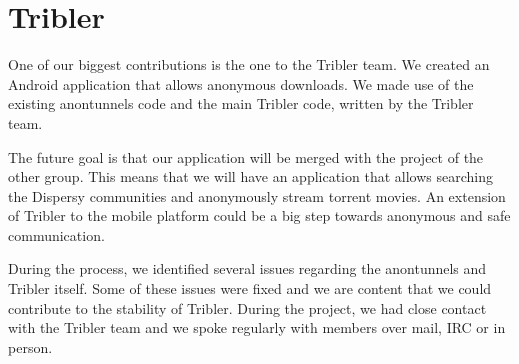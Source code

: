 \section{Tribler}
	One of our biggest contributions is the one to the Tribler team. We created an Android application that allows anonymous downloads. We made use of the existing anontunnels code and the main Tribler code, written by the Tribler team.
	
	The future goal is that our application will be merged with the project of the other group. This means that we will have an application that allows searching the Dispersy communities and anonymously stream torrent movies. An extension of Tribler to the mobile platform could be a big step towards anonymous and safe communication.
	
	During the process, we identified several issues regarding the anontunnels and Tribler itself. Some of these issues were fixed and we are content that we could contribute to the stability of Tribler. During the project, we had close contact with the Tribler team and we spoke regularly with members over mail, IRC or in person.